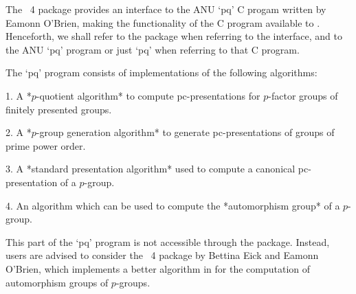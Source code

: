 

The {\GAP}~4 package {\ANUPQ} provides an interface to  the  ANU  `pq'  C
progam written by Eamonn O'Brien,  making  the  functionality  of  the  C
program available to {\GAP}. Henceforth, we shall refer to  the  {\ANUPQ}
package when referring to the {\GAP}  interface,  and  to  the  ANU  `pq'
program or just `pq' when referring to that C program.

The `pq' program consists of implementations of the following algorithms:

\beginlist%

\item{1.}
A *$p$-quotient algorithm* to  compute  pc-presentations  for  $p$-factor
groups of finitely presented groups.


\item{2.} 
A *$p$-group generation algorithm* to generate pc-presentations of groups
of prime power order.


\item{3.}
A  *standard  presentation  algorithm*  used  to  compute   a   canonical
pc-presentation of a $p$-group.


\item{4.} 
An algorithm which can be used to compute the *automorphism group*  of  a
$p$-group.

\item{}
This part of the `pq' program is  not  accessible  through  the  {\ANUPQ}
package. Instead, users are advised  to  consider  the  {\GAP}~4  package
{\AutPGrp} by Bettina Eick and Eamonn O'Brien, which implements a  better
algorithm in  {\GAP}  for  the  computation  of  automorphism  groups  of
$p$-groups.

